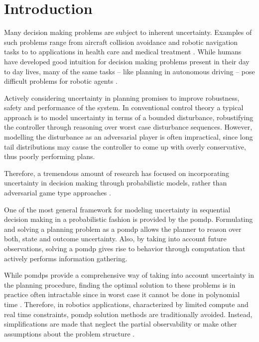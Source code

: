 \chapter{Introduction}\label{chap:introduction}

Many decision making problems are subject to inherent uncertainty. Examples of
such problems range from aircraft collision avoidance and robotic navigation tasks to
to applications in health care and medical treatment
\cite{kochenderfer2012next, schaefer2005modeling}. While humans have
developed good intuition for decision making problems present in their day to
day lives, many of the same tasks -- like planning in autonomous driving --
pose difficult problems for robotic agents \cite{levinson2011towards}.

Actively considering uncertainty in planning promises to improve robustness,
safety and performance of the system. In conventional control theory a typical
approach is to model uncertainty in terms of a bounded disturbance,
robustifying the controller through reasoning over worst case disturbance
sequences. However, modelling the disturbance as an adversarial player is often
impractical, since long tail distributions may cause the controller to come up
with overly conservative, thus poorly performing plans.

Therefore, a tremendous amount of research has focused on incorporating
uncertainty in decision making through probabilistic models, rather than
adversarial game type approaches \cite{roy1999coastal, amato2015planning,
fisac2018probabilistically, choudhury2019dynamic}.

One of the most general framework for modeling uncertainty in sequential
decision making in a probabilistic fashion is provided by the \ac{pomdp}.
Formulating and solving a planning problem as a \ac{pomdp} allows the planner
to reason over both, state and outcome uncertainty. Also, by taking into
account future observations, solving a \ac{pomdp} gives rise to behavior
through computation that actively performs information gathering.

While \acp{pomdp} provide a comprehensive way of taking into account
uncertainty in the planning procedure, finding the optimal solution to these
problems is in practice often intractable since in worst case it cannot be
done in polynomial time \cite{papadimitriou1987complexity}. Therefore, in
robotics applications, characterized by limited compute and real time
constraints, \ac{pomdp} solution methods are traditionally avoided. Instead,
simplifications are made that neglect the partial observability or make other
assumptions about the problem structure \cite{sadigh2016information,
fisac2018probabilistically}.

